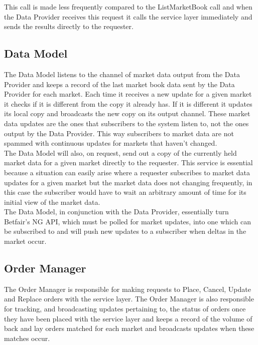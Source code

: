 			This call is made less frequently compared to the ListMarketBook call and when the Data Provider receives this request it calls the service layer immediately and sends the results directly to the requester.\\
	
	
	\subsection{Data Model}
		The Data Model listens to the channel of market data output from the Data Provider and keeps a record of the last market book data sent by the Data Provider for each market. Each time it receives a new update for a given market it checks if it is different from the copy it already has. If it is different it updates its local copy and broadcasts the new copy on its output channel. These market data updates are the ones that subscribers to the system listen to, not the ones output by the Data Provider. This way subscribers to market data are not spammed with continuous updates for markets that haven't changed.\\
		
		The Data Model will also, on request, send out a copy of the currently held market data for a given market directly to the requester. This service is essential because a situation can easily arise where a requester subscribes to market data updates for a given market but the market data does not changing frequently, in this case the subscriber would have to wait an arbitrary amount of time for its initial view of the market data.\\
		
		The Data Model, in conjunction with the Data Provider, essentially turn Betfair's NG API, which must be polled for market updates, into one which can be subscribed to and will push new updates to a subscriber when deltas in the market occur.
		
	\subsection{Order Manager}
		The Order Manager is responsible for making requests to Place, Cancel, Update and Replace orders with the service layer. The Order Manager is also responsible for tracking, and broadcasting updates pertaining to, the status of orders once they have been placed with the service layer and keeps a record of the volume of back and lay orders matched for each market and broadcasts updates when these matches occur.\\
		
